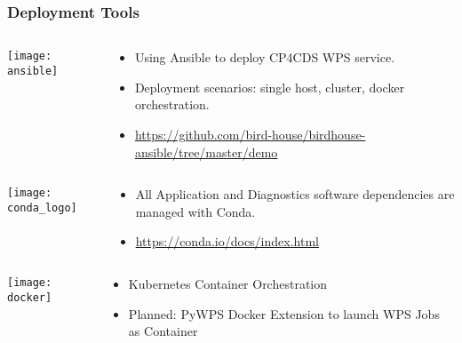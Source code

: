 \documentclass{beamer}
\begin{document}
\begin{frame}
\frametitle<presentation>{Deployment Tools}
  \begin{columns}[T]
    \begin{column}{.2\textwidth}
      \texttt{[image: ansible]}
    \end{column}
    \begin{column}{.8\textwidth}
      \begin{itemize}
        \item Using Ansible to deploy CP4CDS WPS service.
        \item Deployment scenarios: single host, cluster, docker orchestration.
        \item \footnotesize{\url{https://github.com/bird-house/birdhouse-ansible/tree/master/demo}}
      \end{itemize}
    \end{column}
  \end{columns}
  \vspace{0.5cm}
  \begin{columns}[T]
    \begin{column}{.2\textwidth}
      \texttt{[image: conda\_logo]}
    \end{column}
    \begin{column}{.8\textwidth}
      \begin{itemize}
        \item All Application and Diagnostics software dependencies are managed with Conda.
        \item \footnotesize{\url{https://conda.io/docs/index.html}}
      \end{itemize}
    \end{column}
  \end{columns}
  \vspace{0.5cm}
  \begin{columns}[T]
    \begin{column}{.2\textwidth}
      \texttt{[image: docker]}
    \end{column}
    \begin{column}{.8\textwidth}
      \begin{itemize}
        \item Kubernetes Container Orchestration
        \item Planned: PyWPS Docker Extension to launch WPS Jobs as Container
      \end{itemize}
    \end{column}
  \end{columns}

\end{frame}
\end{document}
